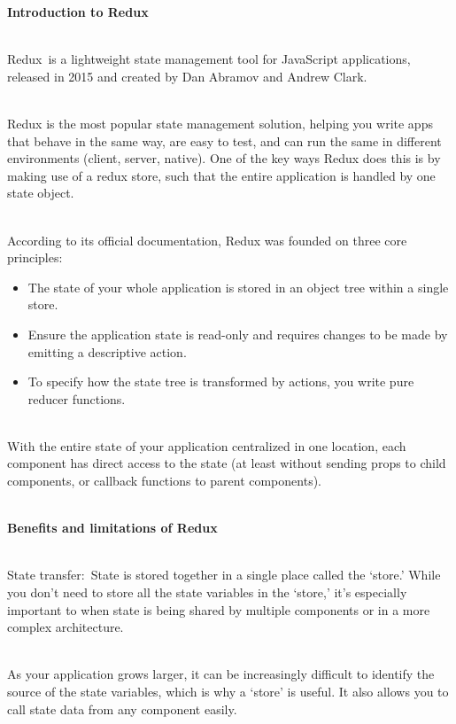 \documentclass{article}
\begin{document}
\noindent \textbf{Introduction to Redux}

\noindent 
\\
Redux~is a lightweight state management tool for JavaScript applications, released in 2015 and created by Dan Abramov and Andrew Clark.

\noindent 
\\
Redux is the most popular state management solution, helping you write apps that behave in the same way, are easy to test, and can run the same in different environments (client, server, native). One of the key ways Redux does this is by making use of a redux store, such that the entire application is handled by one state object.

\noindent 
\\
According to its official documentation, Redux was founded on three core principles:



\begin{itemize}
	\item The state of your whole application is stored in an object tree within a single store.
	\item Ensure the application state is read-only and requires changes to be made by emitting a descriptive action.
	\item To specify how the state tree is transformed by actions, you write pure reducer functions.
\end{itemize}

\noindent







\noindent 
\\
With the entire state of your application centralized in one location, each component has direct access to the state (at least without sending props to child components, or callback functions to parent components).

\noindent \textbf{}

\noindent 
\\
\textbf{Benefits and limitations of Redux}


\noindent \\
State transfer:~State is stored together in a single place called the `store.' While you don't need to store all the state variables in the `store,' it's especially important to when state is being shared by multiple components or in a more complex architecture.

\noindent 
\\
As your application grows larger, it can be increasingly difficult to identify the source of the state variables, which is why a `store' is useful. It also allows you to call state data from any component easily.\\
\end{document}
